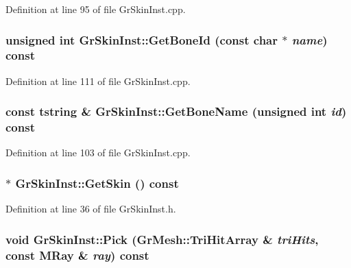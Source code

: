 Definition at line 95 of file GrSkinInst.cpp.\hypertarget{class_gr_skin_inst_a2fc77f57e5873e8967452d9c4359d43}{
\subsubsection[{GetBoneId}]{\setlength{\rightskip}{0pt plus 5cm}unsigned int GrSkinInst::GetBoneId (const char $\ast$ {\em name}) const}}
\label{class_gr_skin_inst_a2fc77f57e5873e8967452d9c4359d43}




Definition at line 111 of file GrSkinInst.cpp.\hypertarget{class_gr_skin_inst_1fce790a944bbf468dacc975b7b020c8}{
\subsubsection[{GetBoneName}]{\setlength{\rightskip}{0pt plus 5cm}const {\bf tstring} \& GrSkinInst::GetBoneName (unsigned int {\em id}) const}}
\label{class_gr_skin_inst_1fce790a944bbf468dacc975b7b020c8}




Definition at line 103 of file GrSkinInst.cpp.\hypertarget{class_gr_skin_inst_d1ba05944156fe4f5a402c554e35b21b}{
\subsubsection[{GetSkin}]{$\ast$ GrSkinInst::GetSkin () const}}
\label{class_gr_skin_inst_d1ba05944156fe4f5a402c554e35b21b}




Definition at line 36 of file GrSkinInst.h.\hypertarget{class_gr_skin_inst_d4d83abff901eccff4500f217c6af8a9}{
\subsubsection[{Pick}]{\setlength{\rightskip}{0pt plus 5cm}void GrSkinInst::Pick ({\bf GrMesh::TriHitArray} \& {\em triHits}, \/  const {\bf MRay} \& {\em ray}) const}}
\label{class_gr_skin_inst_d4d83abff901eccff4500f217c6af8a9}




